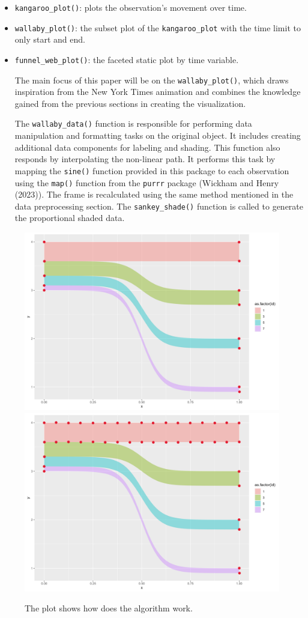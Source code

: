 \begin{itemize}
\item
  \texttt{kangaroo\_plot()}: plots the observation's movement over time.
\item
  \texttt{wallaby\_plot()}: the subset plot of the \texttt{kangaroo\_plot} with the time limit to only start and end.
\item
  \texttt{funnel\_web\_plot()}: the faceted static plot by time variable.

  The main focus of this paper will be on the \texttt{wallaby\_plot()}, which draws inspiration from the New York Times animation and combines the knowledge gained from the previous sections in creating the visualization.

  The \texttt{wallaby\_data()} function is responsible for performing data manipulation and formatting tasks on the original object. It includes creating additional data components for labeling and shading. This function also responds by interpolating the non-linear path. It performs this task by mapping the \texttt{sine()} function provided in this package to each observation using the \texttt{map()} function from the \texttt{purrr} package (Wickham and Henry (2023)). The frame is recalculated using the same method mentioned in the data preprocessing section. The \texttt{sankey\_shade()} function is called to generate the proportional shaded data.
\end{itemize}

\begin{figure}
\includegraphics[width=0.5\linewidth]{figures/sankey-shade-1} \includegraphics[width=0.5\linewidth]{figures/sankey-shade-2} \caption{The plot shows how does the algorithm work.}\label{fig:shade-algorithm}
\end{figure}


